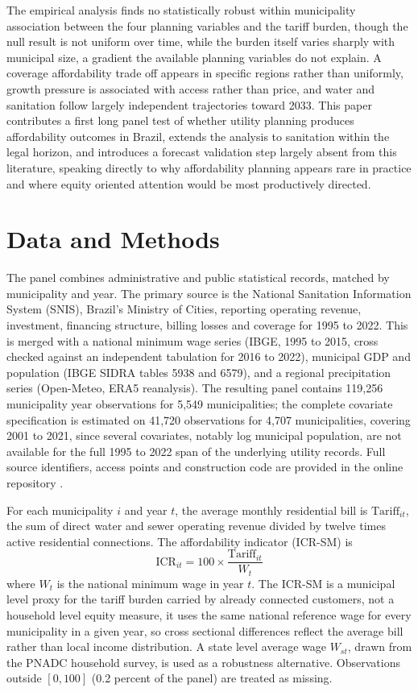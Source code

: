 \documentclass[preprint,12pt]{elsarticle}
\begin{document}
The empirical analysis finds no statistically robust within municipality association between the four planning variables and the tariff burden, though the null result is not uniform over time, while the burden itself varies sharply with municipal size, a gradient the available planning variables do not explain. A coverage affordability trade off appears in specific regions rather than uniformly, growth pressure is associated with access rather than price, and water and sanitation follow largely independent trajectories toward 2033. This paper contributes a first long panel test of whether utility planning produces affordability outcomes in Brazil, extends the analysis to sanitation within the legal horizon, and introduces a forecast validation step largely absent from this literature, speaking directly to why affordability planning appears rare in practice and where equity oriented attention would be most productively directed.

\section{Data and Methods}\label{sec_methods}

The panel combines administrative and public statistical records, matched by municipality and year. The primary source is the National Sanitation Information System (SNIS), Brazil's Ministry of Cities, reporting operating revenue, investment, financing structure, billing losses and coverage for 1995 to 2022. This is merged with a national minimum wage series (IBGE, 1995 to 2015, cross checked against an independent tabulation for 2016 to 2022), municipal GDP and population (IBGE SIDRA tables 5938 and 6579), and a regional precipitation series (Open-Meteo, ERA5 reanalysis). The resulting panel contains 119,256 municipality year observations for 5,549 municipalities; the complete covariate specification is estimated on 41,720 observations for 4,707 municipalities, covering 2001 to 2021, since several covariates, notably log municipal population, are not available for the full 1995 to 2022 span of the underlying utility records. Full source identifiers, access points and construction code are provided in the online repository \citep{Figueredo2026Repo}.

For each municipality $i$ and year $t$, the average monthly residential bill is $\text{Tariff}_{it}$, the sum of direct water and sewer operating revenue divided by twelve times active residential connections. The affordability indicator (ICR-SM) is
\begin{equation}
\text{ICR}_{it} = 100 \times \frac{\text{Tariff}_{it}}{W_{t}}
\label{eq_icr}
\end{equation}
where $W_{t}$ is the national minimum wage in year $t$. The ICR-SM is a municipal level proxy for the tariff burden carried by already connected customers, not a household level equity measure, it uses the same national reference wage for every municipality in a given year, so cross sectional differences reflect the average bill rather than local income distribution. A state level average wage $W_{st}$, drawn from the PNADC household survey, is used as a robustness alternative. Observations outside $[0,100]$ (0.2 percent of the panel) are treated as missing.
\end{document}
